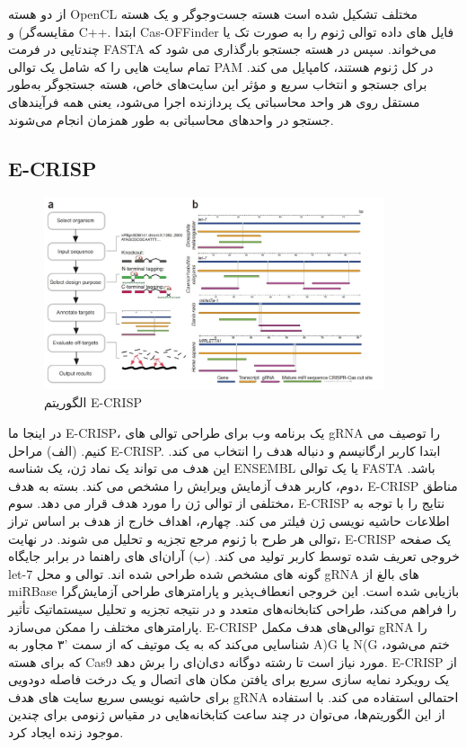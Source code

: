 \documentclass[12pt,a4paper,BCOR=.7cm,headsepline,bibliography=totoc]{report}
\begin{document}
 از دو هسته OpenCL مختلف تشکیل شده است
هسته جست‌وجوگر و یک هسته مقایسه‌گر) و C++. ابتدا Cas-OFFinder فایل های داده توالی ژنوم را به صورت تک یا چندتایی در فرمت FASTA می‌خواند. سپس در هسته جستجو بارگذاری می شود که تمام سایت هایی را که شامل یک توالی PAM در کل ژنوم هستند، کامپایل می کند. برای جستجو و انتخاب سریع و مؤثر این سایت‌های خاص، هسته جستجوگر به‌طور مستقل روی هر واحد محاسباتی یک پردازنده اجرا می‌شود، یعنی همه فرآیندهای جستجو در واحدهای محاسباتی به طور همزمان انجام می‌شوند.


\subsection{E-CRISP ~\cite{E-CRISP}}
\begin{figure}
\centering
\includegraphics[width=10cm, ]{pictures/ecrispr.jpg}
\caption{
الگوریتم E-CRISP
}\label{wrap-fig:4}
\end{figure}

در اینجا ما E-CRISP، یک برنامه وب برای طراحی توالی های gRNA را توصیف می کنیم. (الف) مراحل E-CRISP. ابتدا کاربر ارگانیسم و دنباله هدف را انتخاب می کند. این هدف می تواند یک نماد ژن، یک شناسه ENSEMBL یا یک توالی FASTA باشد. دوم، کاربر هدف آزمایش ویرایش را مشخص می کند. بسته به هدف، E-CRISP مناطق مختلفی از توالی ژن را مورد هدف قرار می دهد.
سوم، E-CRISP نتایج را با توجه به اطلاعات حاشیه نویسی ژن فیلتر می کند. چهارم، اهداف خارج از هدف بر اساس تراز توالی هر طرح با ژنوم مرجع تجزیه و تحلیل می شوند. در نهایت، E-CRISP یک صفحه خروجی تعریف شده توسط کاربر تولید می کند.
(ب) آر‌ان‌ای های راهنما در برابر جایگاه let-7 گونه های مشخص شده طراحی شده اند. توالی و محل gRNA های بالغ از miRBase بازیابی شده است. این خروجی انعطاف‌پذیر و پارامترهای طراحی آزمایش‌گرا را فراهم می‌کند، طراحی کتابخانه‌های متعدد و در نتیجه تجزیه و تحلیل سیستماتیک تأثیر پارامترهای مختلف را ممکن می‌سازد. E-CRISP توالی‌های هدف مکمل gRNA را شناسایی می‌کند که به یک موتیف که از سمت  '۳ مجاور به A)G یا N(G ختم می‌شود، که برای هسته Cas9 مورد نیاز است تا رشته دوگانه دی‌ان‌ای را برش دهد. E-CRISP از یک رویکرد نمایه سازی سریع برای یافتن مکان های اتصال و یک درخت فاصله دودویی برای حاشیه نویسی سریع سایت های هدف gRNA احتمالی استفاده می کند. با استفاده از این الگوریتم‌ها، می‌توان در چند ساعت کتابخانه‌هایی در مقیاس ژنومی برای چندین موجود زنده ایجاد کرد.
\end{document}
